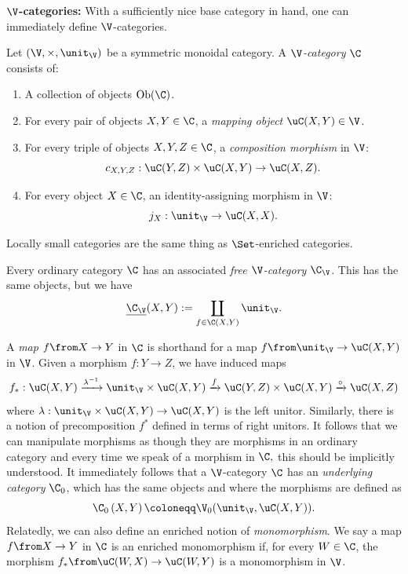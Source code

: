 \documentclass{tac}
\begin{document}
\noindent\textbf{$\V$-categories:} With a sufficiently nice base category in hand, one can immediately define $\V$-categories.
\begin{definition}
\label{def:enrcat}
Let $(\V, \times, \unit_{\V})$ be a symmetric monoidal category. A \emph{$\V$-category} $\C$ consists of:
\begin{enumerate}
    \item A collection of objects $\operatorname{Ob}(\C)$.
    \item For every pair of objects $X, Y \in \C$, a \emph{mapping object} $\uC(X, Y) \in \V$.
    \item For every triple of objects $X, Y, Z \in \C$, a \emph{composition morphism} in $\V$:
    $$ c_{X,Y,Z}: \uC(Y, Z) \times \uC(X, Y) \to \uC(X, Z). $$
    \item For every object $X \in \C$, an identity-assigning morphism in $\V$:
    $$ j_X: \unit_{\V} \to \uC(X, X). $$
\end{enumerate}
\end{definition}
Locally small categories are the same thing as $\Set$-enriched categories.
\begin{example}
    Every ordinary category $\C$ has an associated \emph{free $\V$-category} $\C_{\V}$. This has the same objects, but we have 
    $$
    \underline{\C_{\V}}(X, Y) := \coprod_{f\in \C(X, Y)} \unit_{\V}.
    $$
\end{example}
A \emph{map} $f\from X\to Y$ in $\C$ is shorthand for a map $f\from \unit_{\V} \to \uC(X, Y)$ in $\V$.  Given  a morphism $f: Y\to Z$, we have induced maps
$$
f_\ast: \uC(X, Y) \xrightarrow{\lambda^{-1}} \unit_{\V} \times \uC(X, Y) \xrightarrow{f} \uC(Y, Z)\times \uC(X, Y) \xrightarrow{\circ} \uC(X, Z)
$$
where $\lambda: \unit_{\V} \times \uC(X, Y) \to  \uC(X, Y)$ is the left unitor. Similarly, there is a notion of precomposition $f^\ast$ defined in terms of right unitors. It follows that we can manipulate morphisms as though they are morphisms in an ordinary category and every time we speak of a morphism in $\C,$ this should be implicitly understood.
It immediately follows that a $\V$-category $\C$ has an \emph{underlying category} $\C_0$, which has the same objects and where the morphisms are defined as 
$$
\C_0\left(X , Y\right) \coloneqq \V_0(\unit_{\V}, \uC(X, Y)).
$$
Relatedly, we can also define an enriched notion of \emph{monomorphism}. We say a map $f\from X \to Y$ in $\C$ is an enriched monomorphism if, for every $W\in \C$, the morphism $f_\ast \from \uC(W, X) \to \uC(W,Y)$ is a monomorphism in $\V$.
\end{document}
